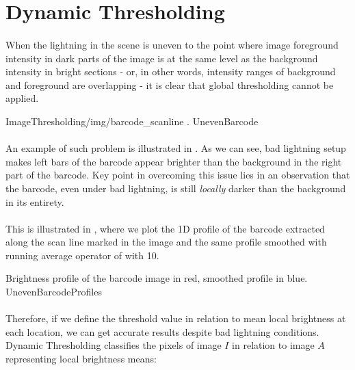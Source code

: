 \section{Dynamic Thresholding}

\paragraph*{}
When the lightning in the scene is uneven to the point where image foreground intensity in dark parts of the image is at the same level as the background intensity in bright sections - or, in other words, intensity ranges of background and foreground are overlapping - it is clear that global thresholding cannot be applied.

\oneFigure
{ImageThresholding/img/barcode_scanline}
{.}
{UnevenBarcode}
{\basicWidth}

\paragraph*{}
An example of such problem is illustrated in . As we can see, bad lightning setup makes left bars of the barcode appear brighter than the background in the right part of the barcode. Key point in overcoming this issue lies in an observation that the barcode, even under bad lightning, is still \textit{locally} darker than the background in its entirety. 

\paragraph*{}
This is illustrated in , where we plot the 1D profile of the barcode extracted along the scan line marked in the image and the same profile smoothed with running average operator of with 10.

\profileFigure
{
}
{Brightness profile of the barcode image in red, smoothed profile in blue.}
{UnevenBarcodeProfiles}

\paragraph*{}
Therefore, if we define the threshold value in relation to mean local brightness at each location, we can get accurate results despite bad lightning conditions. Dynamic Thresholding classifies the pixels of image $I$ in relation to image $A$ representing local brightness means:

